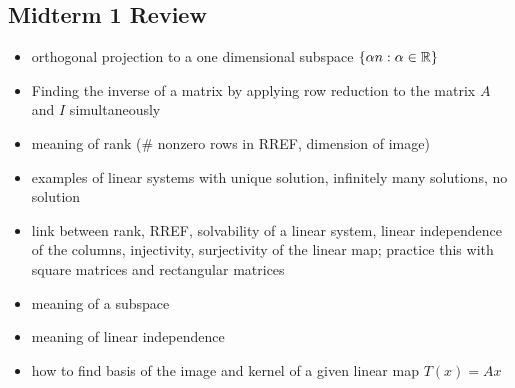 \documentclass[12pt,a4paper]{article}
\def\R{\ifmmode\mathbb R\fi}
\begin{document}
\subsection*{Midterm 1 Review}
\begin{itemize}
    \item orthogonal projection to a one dimensional subspace $\{\alpha n: \alpha \in \R\}$ 
    \item Finding the inverse of a matrix by applying row reduction to the matrix $A$ and $I$ simultaneously
    \item meaning of rank (\# nonzero rows in RREF, dimension of image)
    \item examples of linear systems with unique solution, infinitely many solutions, no solution
    \item link between rank, RREF, solvability of a linear system, linear independence of the columns, injectivity, surjectivity of the linear map; practice this with square matrices and rectangular matrices
    \item meaning of a subspace
    \item meaning of linear independence
    \item how to find basis of the image and kernel of a given linear map $T(x) = Ax$
\end{itemize}
\end{document}
